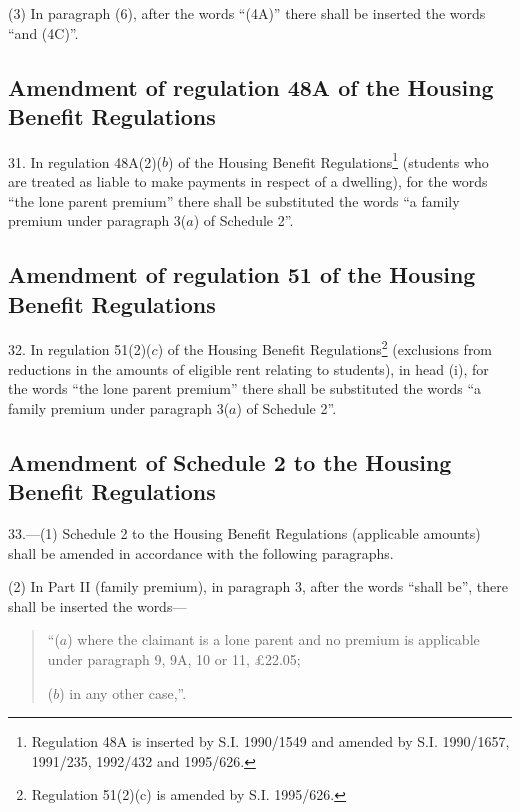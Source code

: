 \documentclass[a4paper]{article}
\begin{document}
(3) In paragraph (6), after the words “(4A)” there shall be inserted the words “and (4C)”.

\subsection[31. Amendment of regulation 48A of the Housing Benefit Regulations]{Amendment of regulation 48A of the Housing Benefit Regulations}

31.  In regulation 48A(2)($b$) of the Housing Benefit Regulations\footnote{\frenchspacing Regulation 48A is inserted by S.I. 1990/1549 and amended by S.I. 1990/1657, 1991/235, 1992/432 and 1995/626.} (students who are treated as liable to make payments in respect of a dwelling), for the words “the lone parent premium” there shall be substituted the words “a family premium under paragraph 3($a$) of Schedule 2”.

\subsection[32. Amendment of regulation 51 of the Housing Benefit Regulations]{Amendment of regulation 51 of the Housing Benefit Regulations}

32.  In regulation 51(2)($c$) of the Housing Benefit Regulations\footnote{\frenchspacing Regulation 51(2)(c) is amended by S.I. 1995/626.} (exclusions from reductions in the amounts of eligible rent relating to students), in head (i), for the words “the lone parent premium” there shall be substituted the words “a family premium under paragraph 3($a$) of Schedule 2”.

\subsection[33. Amendment of Schedule 2 to the Housing Benefit Regulations]{Amendment of Schedule 2 to the Housing Benefit Regulations}

33.—(1) Schedule 2 to the Housing Benefit Regulations (applicable amounts) shall be amended in accordance with the following paragraphs.

(2) In Part II (family premium), in paragraph 3, after the words “shall be”, there shall be inserted the words—
\begin{quotation}
“($a$) where the claimant is a lone parent and no premium is applicable under paragraph 9, 9A, 10 or 11, £22.05;

($b$) in any other case,”.
\end{quotation}
\end{document}
